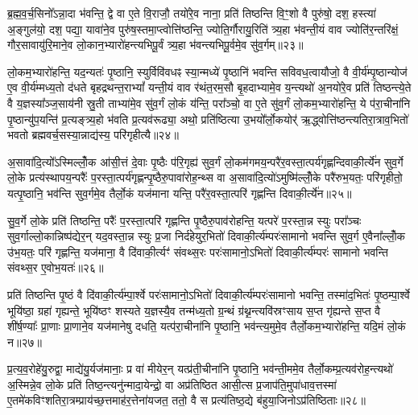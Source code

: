 ब्र॒ह्म॒व॒र्च॒सिनो᳚\-ऽन्ना॒दा भ॑वन्ति॒ द्वे वा ए॒ते वि॒राजौ॒ तयो॑रे॒व नाना॒ प्रति॑ तिष्ठन्ति वि॒ꣳ॒शो वै पुरु॑षो॒ दश॒ हस्त्या॑ अ॒ङ्गुल॑यो॒ दश॒ पद्या॒ यावा॑ने॒व पुरु॑ष॒स्तमा॒प्त्वोत्ति॑ष्ठन्ति॒ ज्योति॒र्गौरायु॒रिति॑ त्र्य॒हा भ॑वन्ती॒यं वाव ज्योति॑र॒न्तरि॑क्षं॒ गौर॒सावायु॑रि॒माने॒व लो॒कान॒भ्यारो॑हन्त्यभिपू॒र्वं त्र्य॒हा भ॑वन्त्यभिपू॒र्वमे॒व सु॑व॒र्गम्॥२३॥

लो॒कम॒भ्यारो॑हन्ति॒ यद॒न्यतः॑ पृ॒ष्ठानि॒ स्युर्विवि॑वधꣴ स्या॒न्मध्ये॑ पृ॒ष्ठानि॑ भवन्ति सविवध॒त्वायौजो॒ वै वी॒र्य॑म्पृ॒ष्ठान्योज॑ ए॒व वी॒र्य॑म्मध्य॒तो द॑धते बृहद्रथन्त॒रा\-भ्यां᳚ यन्ती॒यं वाव र॑थंत॒रम॒सौ बृ॒हदाभ्यामे॒व य॒न्त्यथो॑ अ॒नयो॑रे॒व प्रति॑ तिष्ठन्त्ये॒ते वै य॒ज्ञस्या᳚ञ्ज॒साय॑नी स्रु॒ती ताभ्या॑मे॒व सु॑व॒र्गं लो॒कं य॑न्ति॒ परा᳚ञ्चो॒ वा ए॒ते सु॑व॒र्गं लो॒कम॒भ्यारो॑हन्ति॒ ये प॑रा॒चीना॑नि पृ॒ष्ठान्यु॑प॒यन्ति॑ प्र॒त्यङ्त्र्य॒हो भ॑वति प्र॒त्यव॑रूढ्या॒ अथो॒ प्रति॑ष्ठित्या उ॒भयो᳚र्लो॒कयोर्॑ ऋ॒द्ध्वोत्ति॑ष्ठन्त्यतिरा॒त्राव॒भितो॑ भवतो ब्रह्मवर्च॒सस्या॒न्नाद्य॑स्य॒ परि॑गृहीत्यै॥२४॥

{\anuvakamend[{वृ॒ञ्ज॒ते॒ ब्रह्म॒ चान्न॑ञ्च सुव॒र्गमे॒ते सु॑व॒र्गन्त्रयो॑विꣳशतिश्च॥९॥}]}

अ॒सावा॑दि॒त्यो᳚\-ऽस्मिल्लोँ॒क आ॑सी॒त्तं दे॒वाः पृ॒ष्ठैः प॑रि॒गृह्य॑ सुव॒र्गं लो॒कम॑गमय॒न्परै॑र॒वस्ता॒त्पर्य॑गृह्णन्दिवाकी॒र्त्ये॑न सुव॒र्गे लो॒के प्रत्य॑स्थापय॒न्परैः᳚ प॒रस्ता॒त्पर्य॑गृह्णन्पृ॒ष्ठैरु॒पावा॑रोह॒न्थ्स वा अ॒सावा॑दि॒त्यो॑\-ऽमुष्मि॑ल्लोँ॒के परै॑रुभ॒यतः॒ परि॑गृहीतो॒ यत्पृ॒ष्ठानि॒ भव॑न्ति सुव॒र्गमे॒व तैर्लो॒कं यज॑माना यन्ति॒ परै॑र॒वस्ता॒त्परि॑ गृह्णन्ति दिवाकी॒र्त्ये॑न॥२५॥

सु॒व॒र्गे लो॒के प्रति॑ तिष्ठन्ति॒ परैः᳚ प॒रस्ता॒त्परि॑ गृह्णन्ति पृ॒ष्ठैरु॒पाव॑रोहन्ति॒ यत्परे॑ प॒रस्ता॒न्न स्युः परा᳚ञ्चः सुव॒र्गाल्लो॒कान्निष्प॑द्येर॒न् यद॒वस्ता॒न्न स्युः प्र॒जा निर्द॑हेयुर॒भितो॑ दिवाकी॒र्त्य॑म्परः॑सामानो भवन्ति सुव॒र्ग ए॒वैना᳚ल्लोँ॒क उ॑भ॒यतः॒ परि॑ गृह्णन्ति॒ यज॑माना॒ वै दि॑वाकी॒र्त्यꣳ॑ संवथ्स॒रः परः॑सामानो॒\-ऽभितो॑ दिवाकी॒र्त्य॑म्परः॑ सामानो भवन्ति संवथ्स॒र ए॒वोभ॒यतः॑॥२६॥

प्रति॑ तिष्ठन्ति पृ॒ष्ठं वै दि॑वाकी॒र्त्य॑म्पा॒र्श्वे परः॑सामानो॒\-ऽभितो॑ दिवाकी॒र्त्य॑म्परः॑सामानो भवन्ति॒ तस्मा॑द॒भितः॑ पृ॒ष्ठम्पा॒र्श्वे भूयि॑ष्ठा॒ ग्रहा॑ गृह्यन्ते॒ भूयि॑ष्ठꣳ शस्यते य॒ज्ञस्यै॒व तन्म॑ध्य॒तो ग्र॒न्थं ग्र॑थ्न॒न्त्यवि॑स्रꣳसाय स॒प्त गृ॑ह्यन्ते स॒प्त वै शी॑र्\mbox{}ष॒ण्याः᳚ प्रा॒णाः प्रा॒णाने॒व यज॑मानेषु दधति॒ यत्प॑रा॒चीना॑नि पृ॒ष्ठानि॒ भव॑न्त्य॒मुमे॒व तैर्लो॒कम॒भ्यारो॑हन्ति॒ यदि॒मं लो॒कं न॥२७॥

प्र॒त्य॒व॒रोहे॑यु॒रुद्वा॒ माद्ये॑यु॒र्यज॑मानाः॒ प्र वा॑ मीयेर॒न् यत्प्र॑ती॒चीना॑नि पृ॒ष्ठानि॒ भव॑न्ती॒ममे॒व तैर्लो॒कम्प्र॒त्यव॑रोह॒न्त्यथो॑ अ॒स्मिन्ने॒व लो॒के प्रति॑ तिष्ठ॒न्त्यनु॑न्मादा॒येन्द्रो॒ वा अप्र॑तिष्ठित आसी॒त्स प्र॒जाप॑ति॒मुपा॑धाव॒त्तस्मा॑ ए॒तमे॑कविꣳशतिरा॒त्रम्प्राय॑च्छ॒त्तमाह॑र॒त्तेना॑यजत॒ ततो॒ वै स प्रत्य॑तिष्ठ॒द्ये ब॑हुया॒जिनो\-ऽप्र॑तिष्ठिताः॥२८॥

